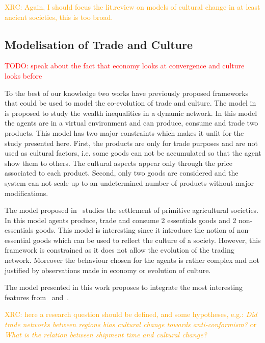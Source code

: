 \documentclass{wscpaperproc}
\newcommand{\memo}[2]{\textcolor{#1}{#2}}
\newcommand{\todo}[1]{\memo{red}{TODO: #1\\}}
\newcommand{\xrc}[1]{\memo{orange}{XRC: #1\\}}
\begin{document}
\xrc{Again, I should focus the lit.review on models of cultural change in at least ancient societies, this is too broad.}

\subsection{Modelisation of Trade and Culture}

\todo{speak about the fact that economy looks at convergence and culture looks before}

To the best of our knowledge two works have previously proposed frameworks that could be used to model the co-evolution of trade and culture. The model in~\cite{bentley_specialisation_2005} is proposed to study the wealth inequalities in a dynamic network. In this model the agents are in a virtual environment and can produce, consume and trade two products. This model has two major constraints which makes it unfit for the study presented here. First, the products are only for trade purposes and are not used as cultural factors, i.e. some goods can not be accumulated so that the agent show them to others. The cultural aspects appear only through the price associated to each product. Second, only two goods are considered and the system can not scale up to an undetermined number of products without major modifications.

The model proposed in~\cite{macmillan_agent-based_2008} studies the settlement of primitive agricultural societies. In this model agents produce, trade and consume 2 essentials goods and 2 non-essentials goods. This model is interesting since it introduce the notion of non-essential goods which can be used to reflect the culture of a society. However, this framework is constrained as it does not allow the evolution of the trading network. Moreover the behaviour chosen for the agents is rather complex and not justified by observations made in economy or evolution of culture.

The model presented in this work proposes to integrate the most interesting features from~\cite{bentley_specialisation_2005} and~\cite{macmillan_agent-based_2008}.

\xrc{here a research question should be defined, and some hypotheses, e.g.: \emph{Did trade networks between regions bias cultural change towards anti-conformism?} or \emph{What is the relation between shipment time and cultural change?}}
\end{document}
